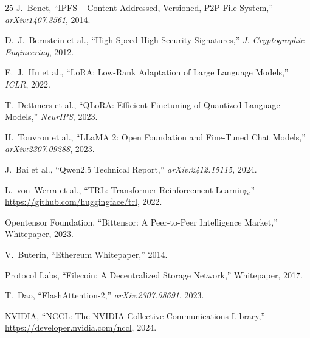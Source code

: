 \documentclass[11pt,letterpaper]{article}
\begin{document}
\begin{thebibliography}{25}
J.~Benet, ``IPFS -- Content Addressed, Versioned, P2P File System,'' \textit{arXiv:1407.3561}, 2014.

D.~J.~Bernstein et al., ``High-Speed High-Security Signatures,'' \textit{J. Cryptographic Engineering}, 2012.

E.~J.~Hu et al., ``LoRA: Low-Rank Adaptation of Large Language Models,'' \textit{ICLR}, 2022.

T.~Dettmers et al., ``QLoRA: Efficient Finetuning of Quantized Language Models,'' \textit{NeurIPS}, 2023.

H.~Touvron et al., ``LLaMA 2: Open Foundation and Fine-Tuned Chat Models,'' \textit{arXiv:2307.09288}, 2023.

J.~Bai et al., ``Qwen2.5 Technical Report,'' \textit{arXiv:2412.15115}, 2024.

L.~von~Werra et al., ``TRL: Transformer Reinforcement Learning,'' \url{https://github.com/huggingface/trl}, 2022.

Opentensor Foundation, ``Bittensor: A Peer-to-Peer Intelligence Market,'' Whitepaper, 2023.

V.~Buterin, ``Ethereum Whitepaper,'' 2014.

Protocol Labs, ``Filecoin: A Decentralized Storage Network,'' Whitepaper, 2017.

T.~Dao, ``FlashAttention-2,'' \textit{arXiv:2307.08691}, 2023.

NVIDIA, ``NCCL: The NVIDIA Collective Communications Library,'' \url{https://developer.nvidia.com/nccl}, 2024.

\end{thebibliography}
\end{document}

